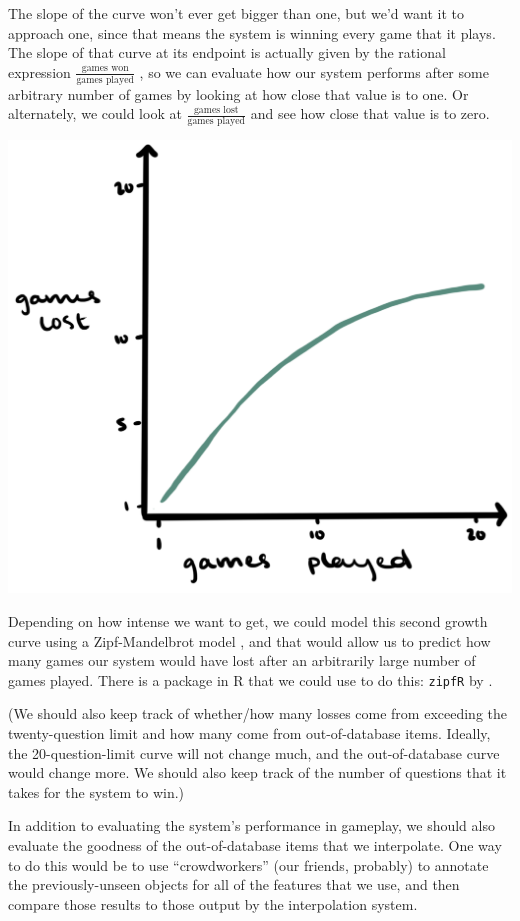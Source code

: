 \documentclass[11pt,a4paper]{article}
\begin{document}
The slope of the curve won't ever get bigger than one, but we'd want it to approach one, since that means the system is winning every game that it plays.
The slope of that curve at its endpoint is actually given by the rational expression $\frac{\text{games won}}{\text{games played}}$ \citep[50--51]{Baayen2001}, so we can evaluate how our system performs after some arbitrary number of games by looking at how close that value is to one.
Or alternately, we could look at $\frac{\text{games lost}}{\text{games played}}$ and see how close that value is to zero.
\begin{center}
	\includegraphics[width=.5\linewidth]{growth-curve2.png}
\end{center}

Depending on how intense we want to get, we could model this second growth curve using a Zipf-Mandelbrot model \citep{Evert2004}, and that would allow us to predict how many games our system would have lost after an arbitrarily large number of games played.
There is a package in R that we could use to do this: \texttt{zipfR} by \citet{BaroniEvert2014}.

(We should also keep track of whether/how many losses come from exceeding the twenty-question limit and how many come from out-of-database items. Ideally, the 20-question-limit curve will not change much, and the out-of-database curve would change more.
We should also keep track of the number of questions that it takes for the system to win.)

In addition to evaluating the system's performance in gameplay, we should also evaluate the goodness of the out-of-database items that we interpolate.
One way to do this would be to use ``crowdworkers'' (our friends, probably) to annotate the previously-unseen objects for all of the features that we use, and then compare those results to those output by the interpolation system.



\end{document}
